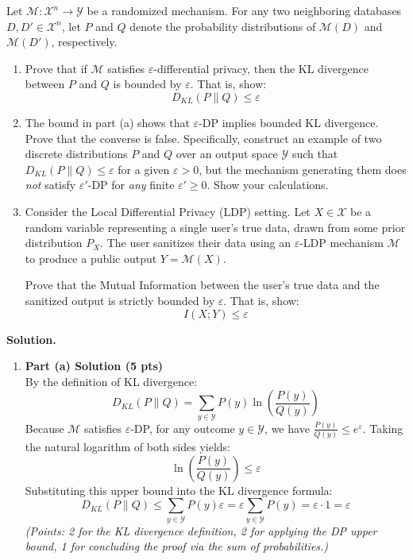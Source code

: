 \documentclass[12pt]{article}
\begin{document}
\begin{enumerate}
Let $\mathcal{M}: \mathcal{X}^n \to \mathcal{Y}$ be a randomized mechanism. For any two neighboring databases $D, D' \in \mathcal{X}^n$, let $P$ and $Q$ denote the probability distributions of $\mathcal{M}(D)$ and $\mathcal{M}(D')$, respectively.

\begin{enumerate}
\item   Prove that if $\mathcal{M}$ satisfies $\varepsilon$-differential privacy, then the KL divergence between $P$ and $Q$ is bounded by $\varepsilon$. That is, show:
\[
D_{KL}(P \parallel Q) \le \varepsilon
\]

\item 
The bound in part (a) shows that $\varepsilon$-DP implies bounded KL divergence. Prove that the converse is false. Specifically, construct an example of two discrete distributions $P$ and $Q$ over an output space $\mathcal{Y}$ such that $D_{KL}(P \parallel Q) \le \varepsilon$ for a given $\varepsilon > 0$, but the mechanism generating them does \textit{not} satisfy $\varepsilon'$-DP for \textit{any} finite $\varepsilon' \ge 0$. Show your calculations.

\item 
Consider the Local Differential Privacy (LDP) setting. Let $X \in \mathcal{X}$ be a random variable representing a single user's true data, drawn from some prior distribution $P_X$. The user sanitizes their data using an $\varepsilon$-LDP mechanism $\mathcal{M}$ to produce a public output $Y = \mathcal{M}(X)$. 

Prove that the Mutual Information between the user's true data and the sanitized output is strictly bounded by $\varepsilon$. That is, show:
\[
I(X ; Y) \le \varepsilon
\]
\end{enumerate}

\begin{solution}
\textbf{Solution.}\\
\begin{enumerate}
\item 
\textbf{Part (a) Solution (5 pts)} \\
By the definition of KL divergence:
\[
D_{KL}(P \parallel Q) = \sum_{y \in \mathcal{Y}} P(y) \ln\left(\frac{P(y)}{Q(y)}\right)
\]
Because $\mathcal{M}$ satisfies $\varepsilon$-DP, for any outcome $y \in \mathcal{Y}$, we have $\frac{P(y)}{Q(y)} \le e^\varepsilon$. Taking the natural logarithm of both sides yields:
\[
\ln\left(\frac{P(y)}{Q(y)}\right) \le \varepsilon
\]
Substituting this upper bound into the KL divergence formula:
\[
D_{KL}(P \parallel Q) \le \sum_{y \in \mathcal{Y}} P(y) \varepsilon = \varepsilon \sum_{y \in \mathcal{Y}} P(y) = \varepsilon \cdot 1 = \varepsilon
\]
\textit{(Points: 2 for the KL divergence definition, 2 for applying the DP upper bound, 1 for concluding the proof via the sum of probabilities.)}



\end{enumerate}
\end{solution}
\end{enumerate}
\end{document}
